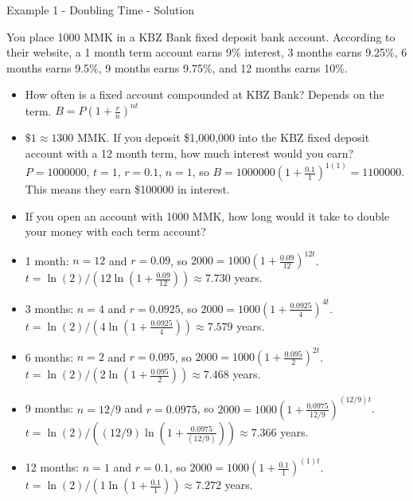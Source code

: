 \documentclass[ignorenonframetext,]{beamer}
\providecommand{\tightlist}{%
  \setlength{\itemsep}{0pt}\setlength{\parskip}{0pt}}
\begin{document}
\begin{frame}{Example 1 - Doubling Time - Solution}

You place 1000 MMK in a KBZ Bank fixed deposit bank account. According
to their website, a 1 month term account earns 9\% interest, 3 months
earns 9.25\%, 6 months earns 9.5\%, 9 months earns 9.75\%, and 12 months
earns 10\%.

\begin{itemize}
\tightlist
\item
  How often is a fixed account compounded at KBZ Bank? Depends on the
  term. \(B = P\left(1+\frac{r}{n}\right)^{nt}\)
\item
  \(\$ 1 \approx 1300\) MMK. If you deposit \$1,000,000 into the KBZ
  fixed deposit account with a 12 month term, how much interest would
  you earn? \(P = 1000000\), \(t = 1\), \(r = 0.1\), \(n = 1\), so
  \(B = 1000000\left(1+\frac{0.1}{1}\right)^{1(1)} = 1100000\). This
  means they earn \$100000 in interest.
\item
  If you open an account with 1000 MMK, how long would it take to double
  your money with each term account?
\item
  1 month: \(n = 12\) and \(r = 0.09\), so
  \(2000 = 1000\left(1+\frac{0.09}{12}\right)^{12t}\).
  \(t = \ln(2)/(12\ln\left(1+\frac{0.09}{12}\right)) \approx 7.730\)
  years.
\item
  3 months: \(n = 4\) and \(r = 0.0925\), so
  \(2000 = 1000\left(1+\frac{0.0925}{4}\right)^{4t}\).
  \(t = \ln(2)/(4\ln\left(1+\frac{0.0925}{4}\right)) \approx 7.579\)
  years.
\item
  6 months: \(n = 2\) and \(r = 0.095\), so
  \(2000 = 1000\left(1+\frac{0.095}{2}\right)^{2t}\).
  \(t = \ln(2)/(2\ln\left(1+\frac{0.095}{2}\right)) \approx 7.468\)
  years.
\item
  9 months: \(n = 12/9\) and \(r = 0.0975\), so
  \(2000 = 1000\left(1+\frac{0.0975}{12/9}\right)^{(12/9)t}\).
  \(t = \ln(2)/((12/9)\ln\left(1+\frac{0.0975}{(12/9)}\right)) \approx 7.366\)
  years.
\item
  12 months: \(n = 1\) and \(r = 0.1\), so
  \(2000 = 1000\left(1+\frac{0.1}{1}\right)^{(1)t}\).
  \(t = \ln(2)/(1\ln\left(1+\frac{0.1}{1}\right)) \approx 7.272\) years.
\end{itemize}

\end{frame}
\end{document}
